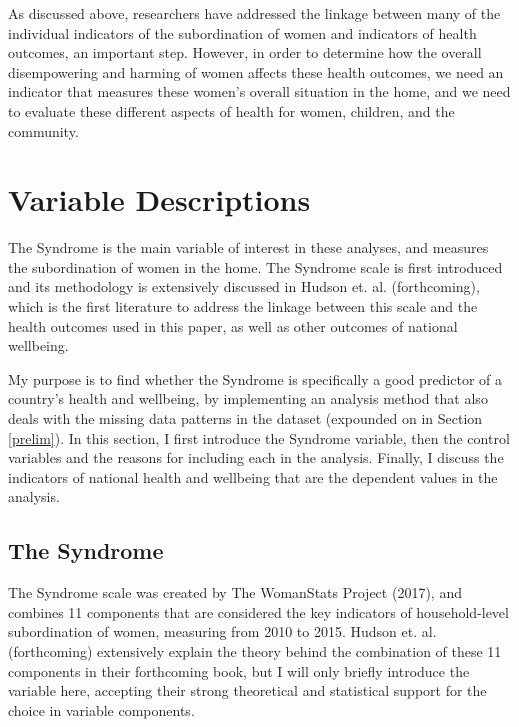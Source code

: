 As discussed above, researchers have addressed the linkage between many of the individual indicators of the subordination of women and indicators of health outcomes, an important step. However, in order to determine how the overall disempowering and harming of women affects these health outcomes, we need an indicator that measures these women's overall situation in the home, and we need to evaluate these different aspects of health for women, children, and the community. 

\section{Variable Descriptions}

The Syndrome is the main variable of interest in these analyses, and measures the subordination of women in the home. The Syndrome scale is first introduced and its methodology is extensively discussed in Hudson et. al. (forthcoming), which is the first literature to address the linkage between this scale and the health outcomes used in this paper, as well as other outcomes of national wellbeing.

My purpose is to find whether the Syndrome is specifically a good predictor of a country's health and wellbeing, by implementing an analysis method that also deals with the missing data patterns in the dataset (expounded on in Section \ref{prelim}). In this section, I first introduce the Syndrome variable, then the control variables and the reasons for including each in the analysis. Finally, I discuss the indicators of national health and wellbeing that are the dependent values in the analysis.

\subsection{The Syndrome} \label{syndrome}

The Syndrome scale was created by The WomanStats Project (2017), and combines 11 components that are considered the key indicators of household-level subordination of women, measuring from 2010 to 2015. Hudson et. al. (forthcoming) extensively explain the theory behind the combination of these 11 components in their forthcoming book, but I will only briefly introduce the variable here, accepting their strong theoretical and statistical support for the choice in variable components. 

